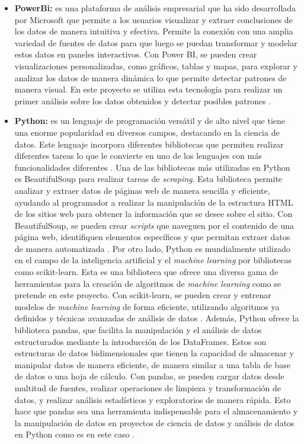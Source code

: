   \begin{itemize}
    \item \textbf{PowerBi:}
     es una plataforma de análisis empresarial que ha sido desarrollada por Microsoft que permite a los usuarios visualizar y extraer conclusiones de los datos de manera intuitiva y efectiva. Permite la conexión con una amplia variedad de fuentes de datos para que luego se puedan transformar y modelar estos datos en paneles interactivos. Con Power BI, se pueden crear visualizaciones personalizadas, como gráficos, tablas y mapas, para explorar y analizar los datos de manera dinámica lo que permite detectar patrones de manera visual. En este proyecto se utiliza esta tecnología para realizar un primer análisis sobre los datos obtenidos y detectar posibles patrones \cite{powerbi}. 
    \item \textbf{Python:}
     es un lenguaje de programación versátil y de alto nivel que tiene una enorme popularidad en diversos campos, destacando en la ciencia de datos. Este lenguaje incorpora diferentes bibliotecas que permiten realizar diferentes tareas lo que le convierte en uno de los lenguajes con más funcionalidades diferentes \cite{python}. Una de las bibliotecas más utilizadas en Python es BeautifulSoup para realizar tareas de \textit{scraping}. Esta biblioteca permite analizar y extraer datos de páginas web de manera sencilla y eficiente, ayudando al programador a realizar la manipulación de la estructura HTML de los sitios web para obtener la información que se desee sobre el sitio. Con BeautifulSoup, se pueden crear \textit{scripts} que naveguen por el contenido de una página web, identifiquen elementos específicos y que permitan extraer datos de manera automatizada \cite{beautifulsoup}. Por otro lado, Python es mundialmente utilizado en el campo de la inteligencia artificial y el \textit{machine learning} por bibliotecas como scikit-learn. Esta es una biblioteca que ofrece una diversa gama de herramientas para la creación de algoritmos de \textit{machine learning} como se pretende en este proyecto. Con scikit-learn, se pueden crear y entrenar modelos de \textit{machine learning} de forma eficiente, utilizando algoritmos ya definidos y técnicas avanzadas de análisis de datos \cite{scikit}. Además, Python ofrece la biblioteca pandas, que facilita la manipulación y el análisis de datos estructurados mediante la introducción de los DataFrames. Estos son estructuras de datos bidimensionales que tienen la capacidad de almacenar y manipular datos de manera eficiente, de manera similar a una tabla de base de datos o una hoja de cálculo. Con pandas, se pueden cargar datos desde multitud de fuentes, realizar operaciones de limpieza y transformación de datos, y realizar análisis estadísticos y exploratorios de manera rápida. Esto hace que pandas sea una herramienta indispensable para el almacenamiento y la manipulación de datos en proyectos de ciencia de datos y análisis de datos en Python como es en este caso \cite{pandas}.
    

\end{itemize}
